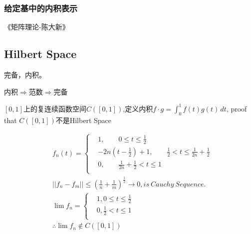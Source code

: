 \documentclass[UTF8]{../../09-Mathematics}
\begin{document}
\subsubsection{给定基中的内积表示}

《矩阵理论-陈大新》


\subsection{Hilbert Space}

完备，内积。

内积$\Rightarrow$范数$\Rightarrow$完备


\begin{proposition}
  $[0,1]$上的复连续函数空间$ C([0, 1])$,定义内积$f \cdot g = \int_{0}^{1} f(t)g(t) \,dt $, proof that $ C([0, 1])$不是Hilbert Space

  \begin{equation}
    \begin{aligned}
    &f_n(t) =
    \begin{cases}
    &1,\qquad 0 \leqslant t \leqslant \frac{1}{2}\\
    &-2n(t- \frac{1}{2}) + 1,\qquad \frac{1}{2} < t \leqslant \frac{1}{2n} + \frac{1}{2}\\
    &0, \qquad \frac{1}{2n} + \frac{1}{2} < t \leqslant 1\\
    \end{cases}\\
    &|| f_n - f_m|| \leqslant (\frac{1}{n} + \frac{1}{m})^{\frac{1}{2}} \rightarrow 0, is \  Cauchy \  Sequence.\\
    & \lim f_n = 
    \begin{cases}
      &1,  0 \leqslant t \leqslant \frac{1}{2}\\
      &0,  \frac{1}{2} < t \leqslant 1\\
    \end{cases}\\
    & \therefore \lim f_n \notin C([0, 1])
    \end{aligned}
  \end{equation}

\end{proposition}
\end{document}
